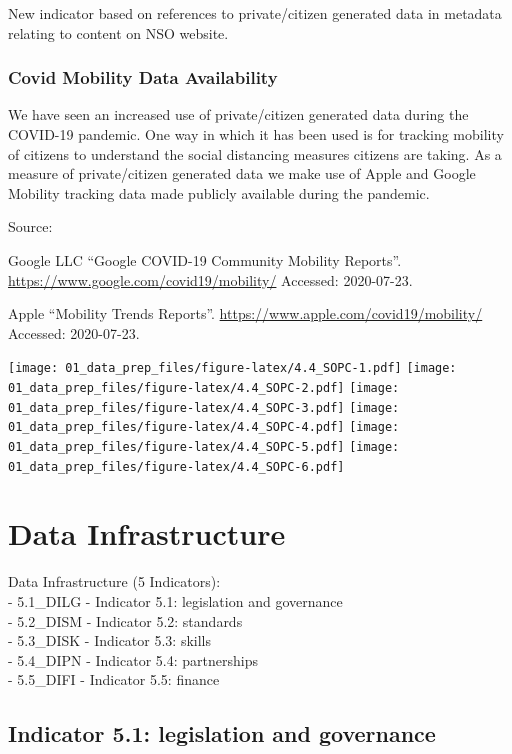 \documentclass[]{article}
\begin{document}
New indicator based on references to private/citizen generated data in
metadata relating to content on NSO website.

\hypertarget{covid-mobility-data-availability}{%
\subsubsection{Covid Mobility Data
Availability}\label{covid-mobility-data-availability}}

We have seen an increased use of private/citizen generated data during
the COVID-19 pandemic. One way in which it has been used is for tracking
mobility of citizens to understand the social distancing measures
citizens are taking. As a measure of private/citizen generated data we
make use of Apple and Google Mobility tracking data made publicly
available during the pandemic.

Source:

Google LLC ``Google COVID-19 Community Mobility Reports''.
\url{https://www.google.com/covid19/mobility/} Accessed: 2020-07-23.

Apple ``Mobility Trends Reports''.
\url{https://www.apple.com/covid19/mobility/} Accessed: 2020-07-23.

\texttt{[image: 01\_data\_prep\_files/figure-latex/4.4\_SOPC-1.pdf]}
\texttt{[image: 01\_data\_prep\_files/figure-latex/4.4\_SOPC-2.pdf]}
\texttt{[image: 01\_data\_prep\_files/figure-latex/4.4\_SOPC-3.pdf]}
\texttt{[image: 01\_data\_prep\_files/figure-latex/4.4\_SOPC-4.pdf]}
\texttt{[image: 01\_data\_prep\_files/figure-latex/4.4\_SOPC-5.pdf]}
\texttt{[image: 01\_data\_prep\_files/figure-latex/4.4\_SOPC-6.pdf]}

\hypertarget{data-infrastructure}{%
\section{Data Infrastructure}\label{data-infrastructure}}

Data Infrastructure (5 Indicators):\\
- 5.1\_DILG - Indicator 5.1: legislation and governance\\
- 5.2\_DISM - Indicator 5.2: standards\\
- 5.3\_DISK - Indicator 5.3: skills\\
- 5.4\_DIPN - Indicator 5.4: partnerships\\
- 5.5\_DIFI - Indicator 5.5: finance

\hypertarget{indicator-5.1-legislation-and-governance}{%
\subsection{Indicator 5.1: legislation and
governance}\label{indicator-5.1-legislation-and-governance}}
\end{document}
